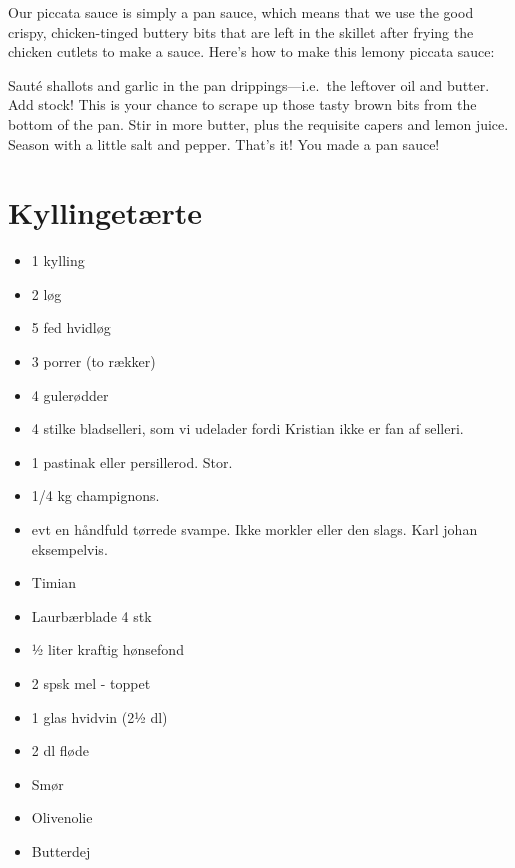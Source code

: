 \documentclass[
]{book}
\providecommand{\tightlist}{%
  \setlength{\itemsep}{0pt}\setlength{\parskip}{0pt}}
\begin{document}
Our piccata sauce is simply a pan sauce, which means that we use the good crispy, chicken-tinged buttery bits that are left in the skillet after frying the chicken cutlets to make a sauce. Here's how to make this lemony piccata sauce:

Sauté shallots and garlic in the pan drippings---i.e.~the leftover oil and butter.
Add stock! This is your chance to scrape up those tasty brown bits from the bottom of the pan.
Stir in more butter, plus the requisite capers and lemon juice.
Season with a little salt and pepper.
That's it! You made a pan sauce!

\section{Kyllingetærte}\label{kyllingetuxe6rte}

\begin{itemize}
\tightlist
\item
  1 kylling
\item
  2 løg
\item
  5 fed hvidløg
\item
  3 porrer (to rækker)
\item
  4 gulerødder
\item
  4 stilke bladselleri, som vi udelader fordi Kristian ikke er fan af selleri.
\item
  1 pastinak eller persillerod. Stor.
\item
  1/4 kg champignons.
\item
  evt en håndfuld tørrede svampe. Ikke morkler eller den slags. Karl johan eksempelvis.
\item
  Timian
\item
  Laurbærblade 4 stk
\item
  ½ liter kraftig hønsefond
\item
  2 spsk mel - toppet
\item
  1 glas hvidvin (2½ dl)
\item
  2 dl fløde
\item
  Smør
\item
  Olivenolie
\item
  Butterdej
\end{itemize}
\end{document}
